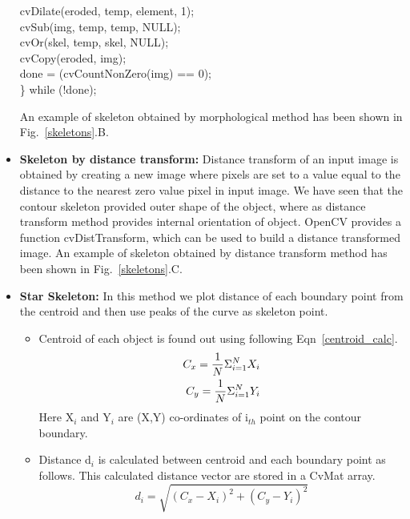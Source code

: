 \begin{itemize}
{{ \hspace*{1 in}cvDilate(eroded, temp, element, 1);\\
 \hspace*{1 in}cvSub(img, temp, temp, NULL);\\
 \hspace*{1 in}cvOr(skel, temp, skel, NULL);\\
 \hspace*{1 in}cvCopy(eroded, img);\\
 \hspace*{1 in}done = (cvCountNonZero(img) == 0);\\
 \} while (!done);
}} \par
\indent An example of skeleton obtained by morphological method has been
shown in Fig.~\ref{skeletons}.B.
\item \textbf{Skeleton by distance transform:} Distance transform of an
 input image is obtained by creating a new image where pixels are
 set to a value equal to the distance to the nearest zero value
 pixel in input image. We have seen that the contour skeleton
 provided outer shape of the object, where as distance transform
 method provides internal orientation of object. OpenCV provides
 a function cvDistTransform, which can be used to build a
 distance transformed image. An example of skeleton obtained by
 distance transform method has been shown in
 Fig.~\ref{skeletons}.C.
\item \textbf{Star Skeleton:} In this method we plot distance of each
 boundary point from the centroid and then use peaks of the curve
 as skeleton point.
\begin{itemize}
\item Centroid of each object is found out using following
 Eqn~\ref{centroid_calc}.
 \begin{eqnarray}
 C_x = {1 \over N} \Sigma ^N _{i = 1} X_i \label{centroid_calc}
\nonumber \\
 C_y = {1 \over N} \Sigma ^N _{i = 1} Y_i 
 \end{eqnarray}
Here X$_i$ and Y$_i$ are (X,Y) co-ordinates of i$_{th}$ point on the contour
boundary.
\item Distance d$_i$ is calculated between centroid and each boundary
 point as follows. This calculated distance vector are stored in a
 CvMat array.
 \begin{equation}
 d_i = \sqrt{(C_x - X_i)^2 + (C_y - Y_i)^2} \label{dist_calc}
 \end{equation}


\end{itemize}
\end{itemize}
